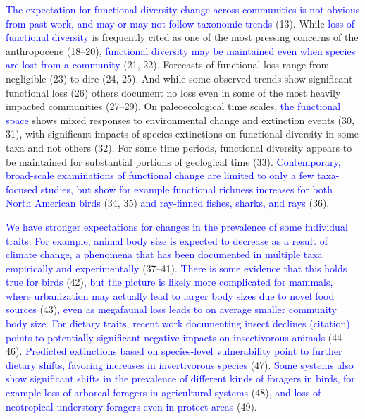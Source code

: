 \documentclass{article}
\begin{document}
\textcolor{blue}{The expectation for functional diversity change across communities is not obvious from past work, and may or may not follow taxonomic trends}
(13). While \textcolor{blue}{loss of functional diversity} is frequently
cited as one of the most pressing concerns of the anthropocene (18--20),
\textcolor{blue}{functional diversity may be maintained even when species are lost from a community}
(21, 22). Forecasts of functional loss range from negligible (23) to
dire (24, 25). And while some observed trends show significant
functional loss (26) others document no loss even in some of the most
heavily impacted communities (27--29). On paleoecological time scales,
\textcolor{blue}{the functional space} shows mixed responses to
environmental change and extinction events (30, 31), with significant
impacts of species extinctions on functional diversity in some taxa and
not others (32). For some time periods, functional diversity appears to
be maintained for substantial portions of geological time (33).
\textcolor{blue}{Contemporary, broad-scale examinations of functional change are limited to only a few taxa-focused studies, but show for example functional richness increases for both North American birds}
(34, 35) \textcolor{blue}{and ray-finned fishes, sharks, and rays} (36).

\textcolor{blue}{We have stronger expectations for changes in the prevalence of some individual traits. For example, animal body size is expected to decrease as a result of climate change, a phenomena that has been documented in multiple taxa empirically and experimentally}
(37--41).
\textcolor{blue}{There is some evidence that this holds true for birds }(42)\textcolor{blue}{, but the picture is likely more complicated for mammals, where urbanization may actually lead to larger body sizes due to novel food sources}
(43)\textcolor{blue}{, even as megafaunal loss leads to on average smaller community body size. For dietary traits, recent work documenting insect declines (citation) points to potentially significant negative impacts on insectivorous animals}
(44--46).
\textcolor{blue}{Predicted extinctions based on species-level vulnerability point to further dietary shifts, favoring increases in invertivorous species }(47).
\textcolor{blue}{Some systems also show significant shifts in the prevalence of different kinds of foragers in birds, for example loss of arboreal foragers in agricultural systems}
(48)\textcolor{blue}{, and loss of neotropical understory foragers even in protect areas}
(49).
\end{document}

